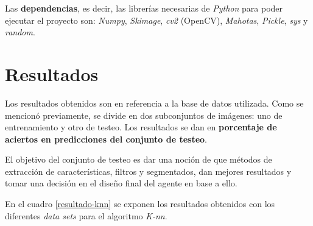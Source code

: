 \documentclass[10pt,a4paper]{article}
\begin{document}
Las \textbf{dependencias}, es decir, las librerías necesarias de \textit{Python} para poder ejecutar el proyecto son: \textit{Numpy}, \textit{Skimage}, \textit{cv2} (OpenCV), \textit{Mahotas}, \textit{Pickle}, \textit{sys} y \textit{random}.

\section{Resultados\label{resultados}}
Los resultados obtenidos son en referencia a la base de datos utilizada. Como se mencionó previamente, se divide en dos subconjuntos de imágenes: uno de entrenamiento y otro de testeo. Los resultados se dan en \textbf{porcentaje de aciertos en predicciones del conjunto de testeo}.

El objetivo del conjunto de testeo es dar una noción de que métodos de extracción de características, filtros y segmentados, dan mejores resultados y tomar una decisión en el diseño final del agente en base a ello. 

En el cuadro \ref{resultado-knn} se exponen los resultados obtenidos con los diferentes \textit{data sets} para el algoritmo \textit{K-nn}.
\end{document}
